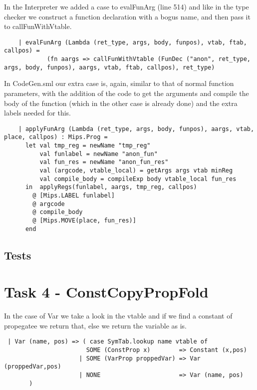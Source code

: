 \documentclass{article}
\begin{document}
\noindent In the Interpreter we added a case to evalFunArg (line 514) and like in the type checker we construct a function declaration with a bogus name, and then pass it to callFunWithVtable.

\begin{lstlisting}
    | evalFunArg (Lambda (ret_type, args, body, funpos), vtab, ftab, callpos) =
            (fn aargs => callFunWithVtable (FunDec ("anon", ret_type, args, body, funpos), aargs, vtab, ftab, callpos), ret_type)
\end{lstlisting}

\noindent In CodeGen.sml our extra case is, again, similar to that of normal function parameters, with the addition of the code to get the arguments and compile the body of the function (which in the other case is already done) and the extra labels needed for this.

\begin{lstlisting}
    | applyFunArg (Lambda (ret_type, args, body, funpos), aargs, vtab, place, callpos) : Mips.Prog =
      let val tmp_reg = newName "tmp_reg"
          val funlabel = newName "anon_fun"
          val fun_res = newName "anon_fun_res"
          val (argcode, vtable_local) = getArgs args vtab minReg
          val compile_body = compileExp body vtable_local fun_res
      in  applyRegs(funlabel, aargs, tmp_reg, callpos)
        @ [Mips.LABEL funlabel]
        @ argcode
        @ compile_body
        @ [Mips.MOVE(place, fun_res)]
      end
\end{lstlisting}

\subsection{Tests}

\newpage

\section{Task 4 - ConstCopyPropFold}
In the case of Var we take a look in the vtable and if we find a constant of propegatee we return that, else we return the variable as is.

\begin{lstlisting}
 | Var (name, pos) => ( case SymTab.lookup name vtable of
                       SOME (ConstProp x)        => Constant (x,pos) 
                     | SOME (VarProp proppedVar) => Var (proppedVar,pos)
                     | NONE                      => Var (name, pos)
       )
\end{lstlisting}
\end{document}
